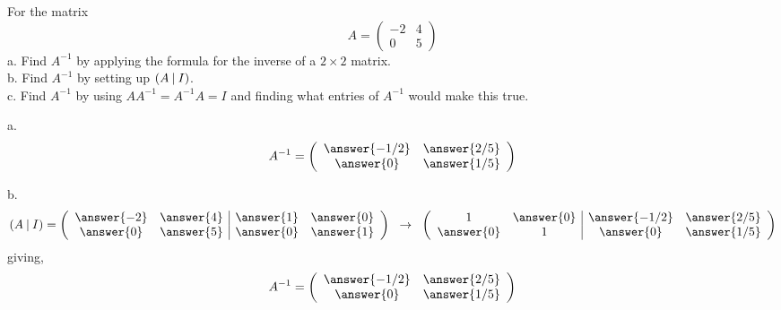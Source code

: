\documentclass{ximera}
\author{Parisa Fatheddin}
\begin{document}
\begin{exercise}
For the matrix
\[A= \left(\begin{array}{cc}
-2 & 4 \\
0 & 5
\end{array}\right)
\]
a. Find $A^{-1}$ by applying the formula for the inverse of a $2\times 2$ matrix.\\
b. Find $A^{-1}$ by setting up $(A \hspace{.08cm}|\hspace{.08cm} I)$. \\
c. Find $A^{-1}$ by using $AA^{-1}= A^{-1}A=I$ and finding what entries of $A^{-1}$ would make this true. 

\begin{prompt}
a. \[
A^{-1} = \left(\begin{array}{cc} \answer{-1/2} & \answer{2/5}\\
\answer{0} & \answer{1/5}
\end{array}\right)
\]

b.
\[ (A \hspace{.08cm}|\hspace{.08cm} I ) = \left(\begin{array}{cc|cc}
\answer{-2} & \answer{4} & \answer{1} & \answer{0}\\
\answer{0} & \answer{5} & \answer{0} & \answer{1}\\
\end{array} \right)
\hspace{.2cm} \rightarrow \hspace{.2cm}
\left(\begin{array}{cc|cc}
1 & \answer{0} & \answer{-1/2} & \answer{2/5}\\
\answer{0} & 1 & \answer{0} & \answer{1/5}
\end{array} \right)
\]
giving,
\[A^{-1} = \left(\begin{array}{cc}
\answer{-1/2} & \answer{2/5}\\
\answer{0} & \answer{1/5}
\end{array} \right)\]


\end{prompt}
\end{exercise}
\end{document}
